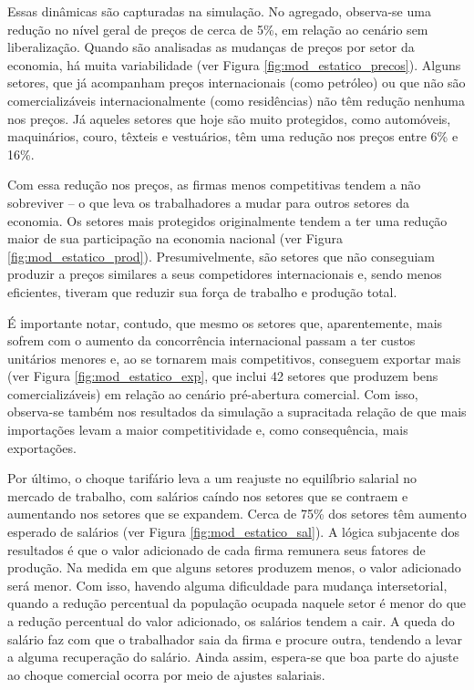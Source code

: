 \documentclass{article}
\begin{document}
Essas dinâmicas são capturadas na simulação. No agregado, observa-se uma redução no nível geral de preços de cerca de 5\%, em relação ao cenário sem liberalização. Quando são analisadas as mudanças de preços por setor da economia, há muita variabilidade (ver Figura \ref{fig:mod_estatico_precos}). Alguns setores, que já acompanham preços internacionais (como petróleo) ou que não são comercializáveis internacionalmente (como residências) não têm redução nenhuma nos preços. Já aqueles setores que hoje são muito protegidos, como automóveis, maquinários, couro, têxteis e vestuários, têm uma redução nos preços entre 6\% e 16\%.


Com essa redução nos preços, as firmas menos competitivas tendem a não sobreviver – o que leva os trabalhadores a mudar para outros setores da economia. Os setores mais protegidos originalmente tendem a ter uma redução maior de sua participação na economia nacional (ver Figura \ref{fig:mod_estatico_prod}). Presumivelmente, são setores que não conseguiam produzir a preços similares a seus competidores internacionais e, sendo menos eficientes, tiveram que reduzir sua força de trabalho e produção total.  

É importante notar, contudo, que mesmo os setores que, aparentemente, mais sofrem com o aumento da concorrência internacional passam a ter custos unitários menores e, ao se tornarem mais competitivos, conseguem exportar mais (ver Figura \ref{fig:mod_estatico_exp}, que inclui 42 setores que produzem bens comercializáveis) em relação ao cenário pré-abertura comercial. Com isso, observa-se também nos resultados da simulação a supracitada relação de que mais importações levam a maior competitividade e, como consequência, mais exportações.

Por último, o choque tarifário leva a um reajuste no equilíbrio salarial no mercado de trabalho, com salários caíndo nos setores que se contraem e aumentando nos setores que se expandem. Cerca de 75\% dos setores têm aumento esperado de salários (ver Figura \ref{fig:mod_estatico_sal}). A lógica subjacente dos resultados é que o valor adicionado de cada firma remunera seus fatores de produção. Na medida em que alguns setores produzem menos, o valor adicionado será menor. Com isso, havendo alguma dificuldade para mudança intersetorial, quando a redução percentual da população ocupada naquele setor é menor do que a redução percentual do valor adicionado, os salários tendem a cair. A queda do salário faz com que o trabalhador saia da firma e procure outra, tendendo a levar a alguma recuperação do salário. Ainda assim, espera-se que boa parte do ajuste ao choque comercial ocorra por meio de ajustes salariais.
\end{document}
